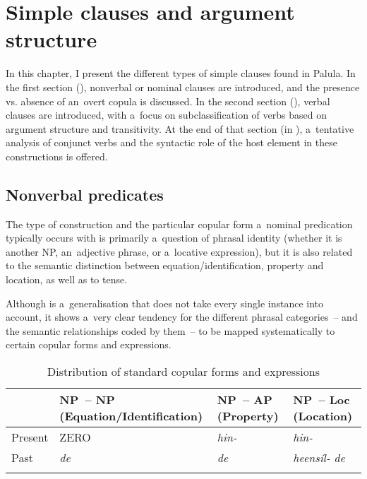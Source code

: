 \chapter{Simple clauses and argument structure}
\label{chap:12}

In this chapter, I present the different types of simple clauses found in Palula. In the first section (), nonverbal or nominal clauses are introduced, and the presence vs. absence of an~overt copula is discussed. In the second section (), verbal clauses are introduced, with a~focus on subclassification of verbs based on argument structure and transitivity. At the end of that section (in ), a~tentative analysis of conjunct verbs and the syntactic role of the host element in these constructions is offered. 


\section{Nonverbal predicates}
\label{sec:12-1}

The type of construction and the particular copular form a~nominal predication typically occurs with is primarily a~question of phrasal identity (whether it is another NP, an~adjective phrase, or a~locative expression), but it is also related to the semantic distinction between equation/identification, property and location, as well as to tense.


Although  is a~generalisation that does not take every single instance into account, it shows a~very clear tendency for the different phrasal categories~-- and the semantic relationships coded by them~-- to be mapped systematically to certain copular forms and expressions. 


\begin{table}[ht]
\caption{Distribution of standard copular forms and expressions}
\begin{tabularx}{\textwidth}{ l Q Q Q }
\lsptoprule
&
NP~-- NP
(Equation/{\allowbreak}Identification) &
NP~-- AP
(Property) &
NP~-- Loc
(Location)\\\hline
Present &
ZERO &
\textit{hin-} &
\textit{hin-}\\
Past &
\textit{de} &
\textit{de} &
\textit{heensíl- de}\\\lspbottomrule
\end{tabularx}
\label{tab:12-1}
\end{table}



